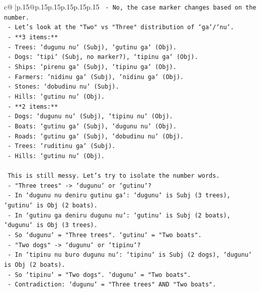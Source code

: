 \documentclass{article}
\begin{document}
{\begin{supertabular}{c@{$\;$}|p{.15\linewidth}@{}p{.15\linewidth}p{.15\linewidth}p{.15\linewidth}p{.15\linewidth}p{.15\linewidth}}
{{{\texttt{   {-} No, the case marker changes based on the number.} \\
\texttt{   {-} Let's look at the "Two" vs "Three" distribution of `ga`/`nu`.} \\
\texttt{     {-} **3 items:**} \\
\texttt{       {-} Trees: `dugunu nu` (Subj), `gutinu ga` (Obj).} \\
\texttt{       {-} Dogs: `tipi` (Subj, no marker?), `tipinu ga` (Obj).} \\
\texttt{       {-} Ships: `pirenu ga` (Subj), `tipinu ga` (Obj).} \\
\texttt{       {-} Farmers: `nidinu ga` (Subj), `nidinu ga` (Obj).} \\
\texttt{       {-} Stones: `dobudinu nu` (Subj).} \\
\texttt{       {-} Hills: `gutinu nu` (Obj).} \\
\texttt{     {-} **2 items:**} \\
\texttt{       {-} Dogs: `dugunu nu` (Subj), `tipinu nu` (Obj).} \\
\texttt{       {-} Boats: `gutinu ga` (Subj), `dugunu nu` (Obj).} \\
\texttt{       {-} Roads: `gutinu ga` (Subj), `dobudinu nu` (Obj).} \\
\texttt{       {-} Trees: `ruditinu ga` (Subj).} \\
\texttt{       {-} Hills: `gutinu nu` (Obj).} \\
\\ 
\texttt{   This is still messy. Let's try to isolate the number words.} \\
\texttt{   {-} "Three trees" {-}> `dugunu` or `gutinu`?} \\
\texttt{     {-} In `dugunu nu deniru gutinu ga`: `dugunu` is Subj (3 trees), `gutinu` is Obj (2 boats).} \\
\texttt{     {-} In `gutinu ga deniru dugunu nu`: `gutinu` is Subj (2 boats), `dugunu` is Obj (3 trees).} \\
\texttt{     {-} So `dugunu` = "Three trees". `gutinu` = "Two boats".} \\
\texttt{   {-} "Two dogs" {-}> `dugunu` or `tipinu`?} \\
\texttt{     {-} In `tipinu nu buro dugunu nu`: `tipinu` is Subj (2 dogs), `dugunu` is Obj (2 boats).} \\
\texttt{     {-} So `tipinu` = "Two dogs". `dugunu` = "Two boats".} \\
\texttt{   {-} Contradiction: `dugunu` = "Three trees" AND "Two boats".} \\
}}}
\end{supertabular}}
\end{document}
